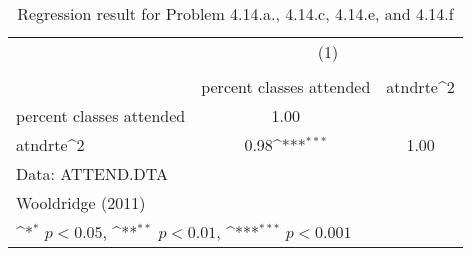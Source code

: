 \begin{table}[htbp]\centering
\def\sym#1{\ifmmode^{#1}\else\(^{#1}\)\fi}
\caption{Regression result for Problem 4.14.a., 4.14.c, 4.14.e, and 4.14.f}
\begin{tabular}{l*{2}{c}}
\toprule
                &\multicolumn{2}{c}{(1)}              \\
                &\multicolumn{2}{c}{}                 \\
                &percent classes attended         &atndrte^2         \\
\midrule
percent classes attended&     1.00         &                  \\
atndrte^2       &     0.98\sym{***}&     1.00         \\
\bottomrule
\multicolumn{3}{l}{\footnotesize Data: ATTEND.DTA}\\
\multicolumn{3}{l}{\footnotesize Wooldridge (2011)}\\
\multicolumn{3}{l}{\footnotesize \sym{*} \(p<0.05\), \sym{**} \(p<0.01\), \sym{***} \(p<0.001\)}\\
\end{tabular}
\end{table}

